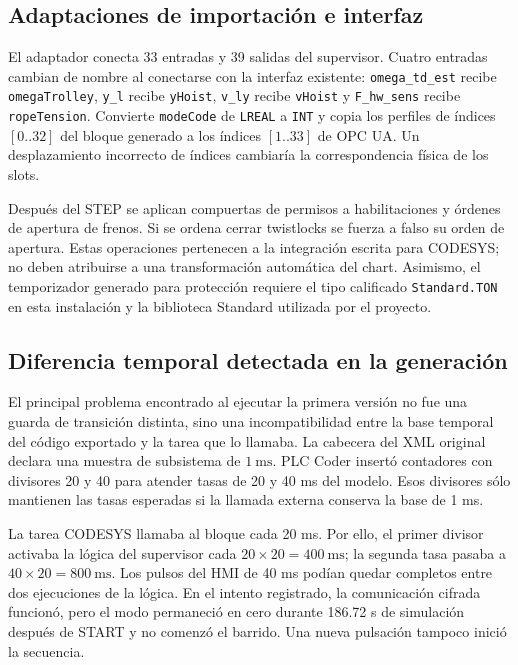 \documentclass[a4paper,10pt,onecolumn,journal]{ieeeconf}
\numberwithin{equation}{section}
\begin{document}
\subsection{Adaptaciones de importación e interfaz}
El adaptador conecta 33 entradas y 39 salidas del supervisor. Cuatro entradas cambian de nombre al conectarse con la interfaz existente: \texttt{omega\_td\_est} recibe \texttt{omegaTrolley}, \texttt{y\_l} recibe \texttt{yHoist}, \texttt{v\_ly} recibe \texttt{vHoist} y \texttt{F\_hw\_sens} recibe \texttt{ropeTension}. Convierte \texttt{modeCode} de \texttt{LREAL} a \texttt{INT} y copia los perfiles de índices $[0..32]$ del bloque generado a los índices $[1..33]$ de OPC UA. Un desplazamiento incorrecto de índices cambiaría la correspondencia física de los slots.

Después del STEP se aplican compuertas de permisos a habilitaciones y órdenes de apertura de frenos. Si se ordena cerrar twistlocks se fuerza a falso su orden de apertura. Estas operaciones pertenecen a la integración escrita para CODESYS; no deben atribuirse a una transformación automática del chart. Asimismo, el temporizador generado para protección requiere el tipo calificado \texttt{Standard.TON} en esta instalación y la biblioteca Standard utilizada por el proyecto.


\subsection{Diferencia temporal detectada en la generación}
El principal problema encontrado al ejecutar la primera versión no fue una guarda de transición distinta, sino una incompatibilidad entre la base temporal del código exportado y la tarea que lo llamaba. La cabecera del XML original declara una muestra de subsistema de $1~\mathrm{ms}$. PLC Coder insertó contadores con divisores 20 y 40 para atender tasas de 20 y 40 ms del modelo. Esos divisores sólo mantienen las tasas esperadas si la llamada externa conserva la base de 1 ms.

La tarea CODESYS llamaba al bloque cada 20 ms. Por ello, el primer divisor activaba la lógica del supervisor cada $20\times20=400~\mathrm{ms}$; la segunda tasa pasaba a $40\times20=800~\mathrm{ms}$. Los pulsos del HMI de 40 ms podían quedar completos entre dos ejecuciones de la lógica. En el intento registrado, la comunicación cifrada funcionó, pero el modo permaneció en cero durante 186.72 s de simulación después de START y no comenzó el barrido. Una nueva pulsación tampoco inició la secuencia.
\end{document}
